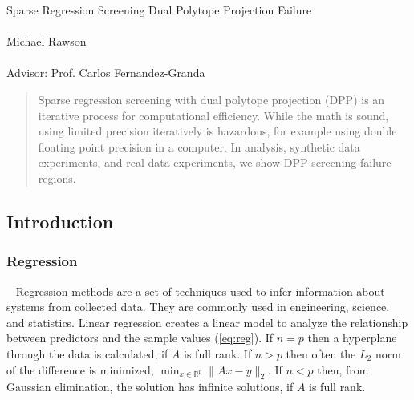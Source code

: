 \documentclass{article}
\begin{document}
\begin{center}
\Large
Sparse Regression Screening Dual Polytope Projection Failure\\
\normalsize
~\\
Michael Rawson\\
~\\
Advisor: Prof. Carlos Fernandez-Granda
\end{center}

\begin{abstract}
Sparse regression screening with dual polytope projection (DPP) is an iterative process for computational efficiency. While the math is sound, using limited precision iteratively is hazardous, for example using double floating point precision in a computer. In analysis, synthetic data experiments, and real data experiments, we show DPP screening failure regions.
\end{abstract}

\subsection*{Introduction}
\subsubsection*{Regression}
\qquad ~ Regression methods are a set of techniques used to infer information about systems from collected data. They are commonly used in engineering, science, and statistics. Linear regression creates a linear model to analyze the relationship between predictors and the sample values (\ref{eq:reg}). If $n=p$ then a hyperplane through the data is calculated, if $A$ is full rank. If $n>p$ then often the $L_2$ norm of the difference is minimized, $\min_{x\in \mathbb{R}^p} \|Ax-y\|_2$. If $n<p$ then, from Gaussian elimination, the solution has infinite solutions, if $A$ is full rank. 
\end{document}
